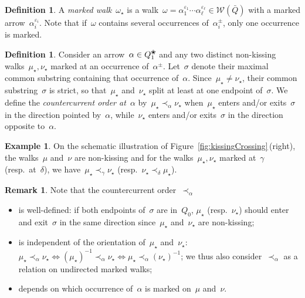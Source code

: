 \documentclass{amsart}
\theoremstyle{definition}
\newtheorem{definition}[theorem]{Definition}
\newtheorem{example}[theorem]{Example}
\newtheorem{remark}[theorem]{Remark}
\newcommand{\fref}[1]{Figure~\ref{#1}} %
\newcommand{\darkblue}{\color{darkblue}} %
\newcommand{\defn}[1]{\textsl{\darkblue #1}} %
\newcommand{\blossom}{^\text{\ding{96}}} %
\newcommand{\walks}{\mathcal{W}} %
\begin{document}
\begin{definition}
A \defn{marked walk}~$\omega_\star$ is a walk~$\omega = \alpha_1^{\varepsilon_1} \cdots \alpha_\ell^{\varepsilon_\ell} \in \walks(\bar Q)$ with a marked arrow~$\alpha_i^{\varepsilon_i}$.
Note that if~$\omega$ contains several occurrences of~$\alpha_i^\pm$, only one occurrence is marked.
\end{definition}

\begin{definition}
Consider an arrow~$\alpha \in Q\blossom_1$ and any two distinct non-kissing walks~$\mu_\star, \nu_\star$ marked at an occurrence of~$\alpha^\pm$.
Let~$\sigma$ denote their maximal common substring containing that occurrence of~$\alpha$.
Since~$\mu_\star \ne \nu_\star$, their common substring~$\sigma$ is strict, so that~$\mu_\star$ and~$\nu_\star$ split at least at one endpoint of~$\sigma$.
We define the \defn{countercurrent order at~$\alpha$} by~$\mu_\star \prec_\alpha \nu_\star$ when~$\mu_\star$ enters and/or exits~$\sigma$ in the direction pointed by~$\alpha$, while~$\nu_\star$ enters and/or exits~$\sigma$ in the direction opposite to~$\alpha$.
\end{definition}

\begin{example}
On the schematic illustration of \fref{fig:kissingCrossing}\,(right), the walks~$\mu$ and~$\nu$ are non-kissing and for the walks~$\mu_\star, \nu_\star$ marked at~$\gamma$ (resp.~at~$\delta$), we have~$\mu_\star \prec_\gamma \nu_\star$ (resp.~$\nu_\star \prec_\delta \mu_\star$).
\end{example}

\begin{remark}
Note that the countercurrent order~$\prec_\alpha$
\begin{itemize}
\item is well-defined: if both endpoints of~$\sigma$ are in~$Q_0$, $\mu_\star$ (resp.~$\nu_\star$) should enter and exit~$\sigma$ in the same direction since~$\mu_\star$ and~$\nu_\star$ are non-kissing;
\item is independent of the orientation of~$\mu_\star$ and~$\nu_\star$:~${\mu_\star \prec_\alpha \nu_\star \!\iff\! (\mu_\star)^{-1} \prec_\alpha \nu_\star \!\iff\! \mu_\star \prec_\alpha (\nu_\star)^{-1}}$; we thus also consider~$\prec_\alpha$ as a relation on undirected marked walks;
\item depends on which occurrence of~$\alpha$ is marked on~$\mu$ and~$\nu$.
\end{itemize}
\end{remark}
\end{document}
